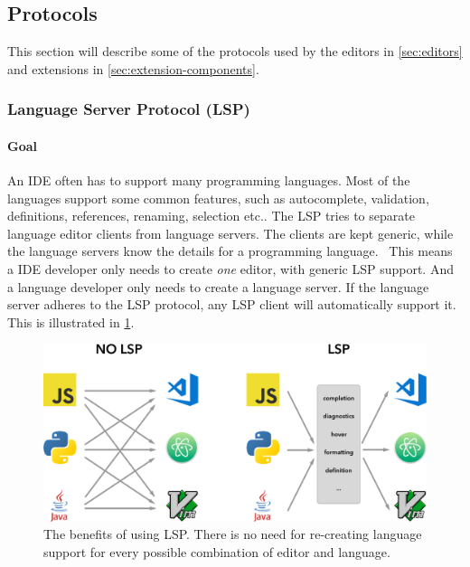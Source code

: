 \subsection{Protocols}\label{sec:protocols}

This section will describe some of the protocols used by the editors in \cref{sec:editors} and extensions in \cref{sec:extension-components}.

\subsubsection{Language Server Protocol (LSP)}\label{sec:lsp}

\paragraph*{Goal} An \gls{IDE} often has to support many programming languages.
Most of the languages support some common features, such as autocomplete,  validation, definitions, references, renaming, selection etc..
The \gls{LSP} tries to separate language editor clients from language servers.
The clients are kept generic, while the language servers know the details for a programming language.~\cite{microsoftOverview}
This means a \gls{IDE} developer only needs to create \textit{one} editor, with generic \gls{LSP} support.
And a language developer only needs to create a language server.
If the language server adheres to the \gls{LSP} protocol, any \gls{LSP} client will automatically support it.
This is illustrated in \cref{fig:lsp-benefits}.

\begin{figure}[htbp]  %
  \centering
  \includegraphics[width=\textwidth]{figures/lsp-languages-editors}
  \caption[LSP Benefits]{The benefits of using \gls{LSP}. There is no need for re-creating language support for every possible combination of editor and language.~\cite{microsoftLanguageServerExtension2020}}\label{fig:lsp-benefits}
\end{figure}


